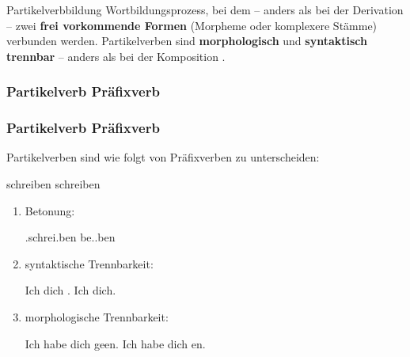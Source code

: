 
\begin{frame}{Partikelverbbildung}
Wortbildungsprozess, bei dem -- anders als bei der Derivation -- zwei \textbf{frei vorkommende Formen} (Morpheme oder komplexere Stämme) verbunden werden. Partikelverben sind \textbf{morphologisch} und \textbf{syntaktisch trennbar} -- anders als bei der Komposition . 
\end{frame}



\subsubsection{Partikelverb \vs Präfixverb}

\begin{frame}
\frametitle{Partikelverb \vs Präfixverb}

Partikelverben sind wie folgt von Präfixverben zu unterscheiden:

\ea  
\ea {}schreiben 
\ex {}schreiben
\z 
\z	
\begin{enumerate}
\item Betonung:

\ea \textipa{\textprimstress}.schrei.ben \vs be.\textipa{\textprimstress}.ben
\z

\item syntaktische Trennbarkeit:

\eal
\ex Ich  dich .
\ex Ich  dich.
\zl

\item morphologische Trennbarkeit:

\eal 
\ex Ich habe dich geen. 
\ex Ich habe dich en.
\zl

\end{enumerate}

\end{frame}


